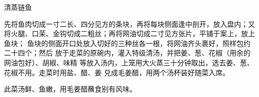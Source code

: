 \begin{recipe}{清蒸链鱼}

\ingredients


\preparation

\step 先将鱼肉切成一寸二长、四分见方的条块，再将每块侧面逢中剖开，放入盘内；又
将火腿、口茉、金钩切成二粗丝；再将网油切成二寸见方张片，平铺于案上，放上鱼块；
鱼块的侧面开口处放入切好的三种丝各一根，将网油齐头裹好，照样包约二十四个；然后
放于走菜的原碗内，灌入特级清汤，并把姜、葱、花椒（用余的网油包好）、胡椒、味精
等放入汤内，上笼用大火蒸三十分钟取出，选去姜、葱、花椒不用。走菜时用盐、醋、姜
兑成毛姜醋，用两个汤杯装好随菜入席。

\features

此菜汤鲜、鱼嫩，用毛姜醋蘸食别有风味。

\end{recipe}

